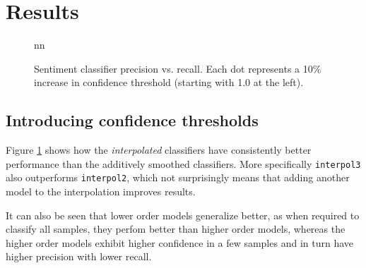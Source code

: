 \documentclass[a4paper,11pt]{kth-mag}
\begin{document}


\newpage
\section{Results}

\begin{figure}[h]
  \centering
  \caption{Sentiment classifier precision vs. recall. Each dot represents a
    10\% increase in confidence threshold (starting with 1.0 at the left).}
  \label{fig:sent_pr_curve}nn
\end{figure}


\subsection{Introducing confidence thresholds}
Figure \ref{fig:sent_pr_curve} shows how the \emph{interpolated} classifiers have
consistently better performance than the additively smoothed classifiers.
More specifically \texttt{interpol3} also outperforms \texttt{interpol2}, which
not surprisingly means that adding another model to the interpolation improves results.

It can also be seen that lower order models generalize better, as when required to
classify all samples, they perfom better than higher order models, whereas the higher
order models exhibit higher confidence in a few samples and in turn have higher
precision with lower recall.
\end{document}
